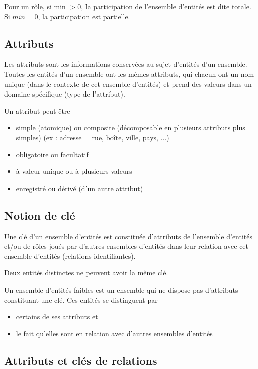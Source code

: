 		Pour un rôle, si min $>0$, la participation de l'ensemble d'entités est dite totale. Si $min = 0$, la participation est partielle.
		
		
			
		\subsection{Attributs}
		
		Les attributs sont les informations conservées au sujet d'entités d'un ensemble. Toutes les entités d'un ensemble ont les mêmes attributs, qui chacun ont un nom unique (dans le contexte de cet ensemble d'entités) et prend des valeurs dans un domaine spécifique (type de l'attribut).
		
		Un attribut peut être
		
		\begin{itemize}
			\item simple (atomique) ou composite (décomposable en plusieurs attributs plus simples) (ex : adresse = rue, boîte, ville, pays, ...)
			\item obligatoire ou facultatif
			\item à valeur unique ou à plusieurs valeurs
			\item enregistré ou dérivé (d'un autre attribut)
		\end{itemize}
		
		
		\subsection{Notion de clé}
		
		Une clé d'un ensemble d'entités est constituée d'attributs de l'ensemble d'entités et/ou de rôles joués par d'autres ensembles d'entités dans leur relation avec cet ensemble d'entités (relations identifiantes).
		
		Deux entités distinctes ne peuvent avoir la même clé.
		
		Un ensemble d'entités faibles est un ensemble qui ne dispose pas d'attributs constituant une clé. Ces entités se distinguent par
		\begin{itemize}
			\item certains de ses attributs et
			\item le fait qu'elles sont en relation avec d'autres ensembles d'entités
		\end{itemize}
		
		\subsection{Attributs et clés de relations}
		
